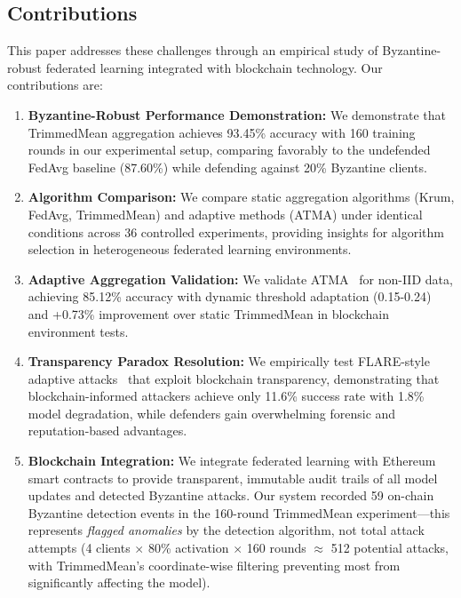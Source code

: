 \documentclass[12pt,a4paper,onecolumn]{article}
\begin{document}
\subsection{Contributions}

This paper addresses these challenges through an empirical study of Byzantine-robust federated learning integrated with blockchain technology. Our contributions are:

\begin{enumerate}
    \item \textbf{Byzantine-Robust Performance Demonstration:} We demonstrate that TrimmedMean aggregation achieves 93.45\% accuracy with 160 training rounds in our experimental setup, comparing favorably to the undefended FedAvg baseline (87.60\%) while defending against 20\% Byzantine clients.
    
    \item \textbf{Algorithm Comparison:} We compare static aggregation algorithms (Krum, FedAvg, TrimmedMean) and adaptive methods (ATMA) under identical conditions across 36 controlled experiments, providing insights for algorithm selection in heterogeneous federated learning environments.
    
    \item \textbf{Adaptive Aggregation Validation:} We validate ATMA~\cite{kalibbala2025atma} for non-IID data, achieving 85.12\% accuracy with dynamic threshold adaptation (0.15-0.24) and +0.73\% improvement over static TrimmedMean in blockchain environment tests.
    
    \item \textbf{Transparency Paradox Resolution:} We empirically test FLARE-style adaptive attacks~\cite{baruch2019little} that exploit blockchain transparency, demonstrating that blockchain-informed attackers achieve only 11.6\% success rate with 1.8\% model degradation, while defenders gain overwhelming forensic and reputation-based advantages.
    
    \item \textbf{Blockchain Integration:} We integrate federated learning with Ethereum smart contracts to provide transparent, immutable audit trails of all model updates and detected Byzantine attacks. Our system recorded 59 on-chain Byzantine detection events in the 160-round TrimmedMean experiment---this represents \emph{flagged anomalies} by the detection algorithm, not total attack attempts (4 clients $\times$ 80\% activation $\times$ 160 rounds $\approx$ 512 potential attacks, with TrimmedMean's coordinate-wise filtering preventing most from significantly affecting the model).
    

\end{enumerate}
\end{document}
